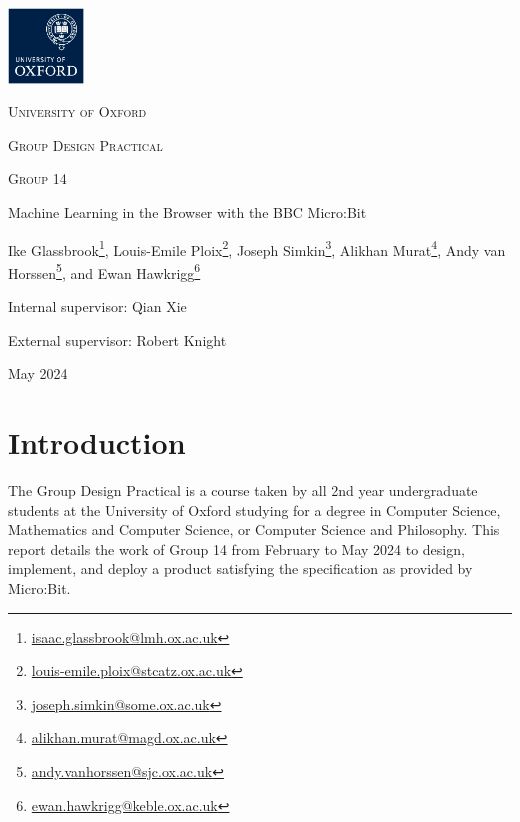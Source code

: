 \documentclass{article}
\begin{document}
\begin{titlepage}
  \centering
  \hphantom{}\par
  \vspace{2cm}
  \includegraphics[width=0.15\textwidth]{logo.png}\par\vspace{0.5cm}
  {\LARGE \textsc{University of Oxford}\par}\vspace{0.5cm}
  {\Large \textsc{Group Design Practical}\par}\vspace{0.5cm}
  {\large \textsc{Group 14}\par}\vspace{0.7cm}
  {\Huge Machine Learning in the Browser with the BBC Micro:Bit\par}\vspace{0.8cm}
  {\large Ike Glassbrook\footnote{\href{mailto:isaac.glassbrook@lmh.ox.ac.uk}{isaac.glassbrook@lmh.ox.ac.uk}}, Louis-Emile Ploix\footnote{\href{mailto:louis-emile.ploix@stcatz.ox.ac.uk}{louis-emile.ploix@stcatz.ox.ac.uk}}, Joseph Simkin\footnote{\href{mailto:joseph.simkin@some.ox.ac.uk}{joseph.simkin@some.ox.ac.uk}}, Alikhan Murat\footnote{\href{mailto:alikhan.murat@magd.ox.ac.uk}{alikhan.murat@magd.ox.ac.uk}}, Andy van Horssen\footnote{\href{mailto:andy.vanhorssen@sjc.ox.ac.uk}{andy.vanhorssen@sjc.ox.ac.uk}}, and Ewan Hawkrigg\footnote{\href{mailto:ewan.hawkrigg@keble.ox.ac.uk}{ewan.hawkrigg@keble.ox.ac.uk}}\par}\vspace{0.7cm}
  {\large Internal supervisor: Qian Xie\par \vspace{0.3cm} External supervisor: Robert Knight \par}\vspace{1cm}
  {\Large May 2024}
\end{titlepage}

\tableofcontents

\section{Introduction}%
\label{sec:intro}

The Group Design Practical is a course taken by all 2nd year undergraduate students at the University of Oxford studying for a degree in Computer Science, Mathematics and Computer Science, or Computer Science and Philosophy. This report details the work of Group 14 from February to May 2024 to design, implement, and deploy a product satisfying the specification as provided by Micro:Bit.
\end{document}

